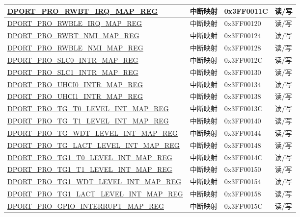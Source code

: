 \begin{longtable}{|L{8.2cm}|L{4.5cm}| l | l | }
\hyperref[regdesc:PRORWBTIRQMAPREG]{DPORT\_PRO\_RWBT\_IRQ\_MAP\_REG} & 中断映射 & 0x3FF0011C & 读/写 \\ \hline
\hyperref[regdesc:PRORWBLEIRQMAPREG]{DPORT\_PRO\_RWBLE\_IRQ\_MAP\_REG} & 中断映射 & 0x3FF00120 & 读/写 \\ \hline
\hyperref[regdesc:PRORWBTNMIMAPREG]{DPORT\_PRO\_RWBT\_NMI\_MAP\_REG} & 中断映射 & 0x3FF00124 & 读/写 \\ \hline
\hyperref[regdesc:PRORWBLENMIMAPREG]{DPORT\_PRO\_RWBLE\_NMI\_MAP\_REG} & 中断映射 & 0x3FF00128 & 读/写 \\ \hline
\hyperref[regdesc:PROSLC0INTRMAPREG]{DPORT\_PRO\_SLC0\_INTR\_MAP\_REG} & 中断映射 & 0x3FF0012C & 读/写 \\ \hline
\hyperref[regdesc:PROSLC1INTRMAPREG]{DPORT\_PRO\_SLC1\_INTR\_MAP\_REG} & 中断映射 & 0x3FF00130 & 读/写 \\ \hline
\hyperref[regdesc:PROUHCI0INTRMAPREG]{DPORT\_PRO\_UHCI0\_INTR\_MAP\_REG} & 中断映射 & 0x3FF00134 & 读/写 \\ \hline
\hyperref[regdesc:PROUHCI1INTRMAPREG]{DPORT\_PRO\_UHCI1\_INTR\_MAP\_REG} & 中断映射 & 0x3FF00138 & 读/写 \\ \hline
\hyperref[regdesc:PROTGT0LEVELINTMAPREG]{DPORT\_PRO\_TG\_T0\_LEVEL\_INT\_MAP\_REG} & 中断映射 & 0x3FF0013C & 读/写 \\ \hline
\hyperref[regdesc:PROTGT1LEVELINTMAPREG]{DPORT\_PRO\_TG\_T1\_LEVEL\_INT\_MAP\_REG} & 中断映射 & 0x3FF00140 & 读/写 \\ \hline
\hyperref[regdesc:PROTGWDTLEVELINTMAPREG]{DPORT\_PRO\_TG\_WDT\_LEVEL\_INT\_MAP\_REG} & 中断映射 & 0x3FF00144 & 读/写 \\ \hline
\hyperref[regdesc:PROTGLACTLEVELINTMAPREG]{DPORT\_PRO\_TG\_LACT\_LEVEL\_INT\_MAP\_REG} & 中断映射 & 0x3FF00148 & 读/写 \\ \hline
\hyperref[regdesc:PROTG1T0LEVELINTMAPREG]{DPORT\_PRO\_TG1\_T0\_LEVEL\_INT\_MAP\_REG} & 中断映射 & 0x3FF0014C & 读/写 \\ \hline
\hyperref[regdesc:PROTG1T1LEVELINTMAPREG]{DPORT\_PRO\_TG1\_T1\_LEVEL\_INT\_MAP\_REG} & 中断映射 & 0x3FF00150 & 读/写 \\ \hline
\hyperref[regdesc:PROTG1WDTLEVELINTMAPREG]{DPORT\_PRO\_TG1\_WDT\_LEVEL\_INT\_MAP\_REG} & 中断映射 & 0x3FF00154 & 读/写 \\ \hline
\hyperref[regdesc:PROTG1LACTLEVELINTMAPREG]{DPORT\_PRO\_TG1\_LACT\_LEVEL\_INT\_MAP\_REG} & 中断映射 & 0x3FF00158 & 读/写 \\ \hline
\hyperref[regdesc:PROGPIOINTERRUPTMAPREG]{DPORT\_PRO\_GPIO\_INTERRUPT\_MAP\_REG} & 中断映射 & 0x3FF0015C & 读/写 \\ \hline

\end{longtable}
